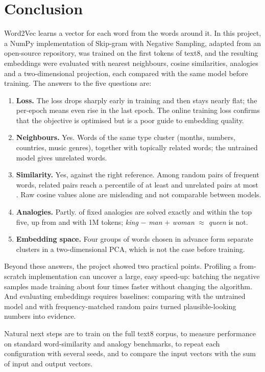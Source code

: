 \section{Conclusion}
\label{sec:conclusion}

Word2Vec learns a vector for each word from the words around it. In this project, a NumPy implementation of Skip-gram with Negative Sampling, adapted from an open-source repository, was trained on the first \FinalTokens{} tokens of text8, and the resulting embeddings were evaluated with nearest neighbours, cosine similarities, analogies and a two-dimensional projection, each compared with the same model before training. The answers to the five questions are:

\begin{enumerate}
    \item[\textbf{Q1}] \textbf{Loss.} The loss drops sharply early in training and then stays nearly flat; the per-epoch means even rise in the last epoch. The online training loss confirms that the objective is optimised but is a poor guide to embedding quality.
    \item[\textbf{Q2}] \textbf{Neighbours.} Yes. Words of the same type cluster (months, numbers, countries, music genres), together with topically related words; the untrained model gives unrelated words.
    \item[\textbf{Q3}] \textbf{Similarity.} Yes, against the right reference. Among random pairs of frequent words, related pairs reach a percentile of at least \FinalRelatedPctMin{} and unrelated pairs at most \FinalControlPctMax. Raw cosine values alone are misleading and not comparable between models.
    \item[\textbf{Q4}] \textbf{Analogies.} Partly. \FinalHitOne{} of \FinalAnswerable{} fixed analogies are solved exactly and \FinalHitFive{} within the top five, up from \DemoHitOne{} and \DemoHitFive{} with 1M tokens; \textit{king} $-$ \textit{man} $+$ \textit{woman} $\approx$ \textit{queen} is not.
    \item[\textbf{Q5}] \textbf{Embedding space.} Four groups of words chosen in advance form separate clusters in a two-dimensional PCA, which is not the case before training.
\end{enumerate}

Beyond these answers, the project showed two practical points. Profiling a from-scratch implementation can uncover a large, easy speed-up: batching the negative samples made training about four times faster without changing the algorithm. And evaluating embeddings requires baselines: comparing with the untrained model and with frequency-matched random pairs turned plausible-looking numbers into evidence.

Natural next steps are to train on the full text8 corpus, to measure performance on standard word-similarity and analogy benchmarks, to repeat each configuration with several seeds, and to compare the input vectors with the sum of input and output vectors.
